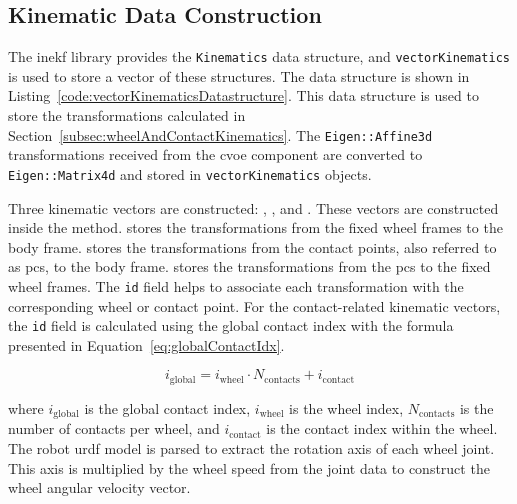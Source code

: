 \documentclass[report.tex]{subfiles}
\begin{document}
    \subsection{Kinematic Data Construction}
    
    The \gls{inekf} library provides the \texttt{Kinematics} data structure, and \texttt{vectorKinematics} is used to store a vector of these structures. The data structure is shown in Listing~\ref{code:vectorKinematicsDatastructure}. This data structure is used to store the transformations calculated in Section~\ref{subsec:wheelAndContactKinematics}. The \texttt{Eigen::Affine3d} transformations received from the \gls{cvoe} component are converted to \texttt{Eigen::Matrix4d} and stored in \texttt{vectorKinematics} objects. 
    
    Three kinematic vectors are constructed: , , and . These vectors are constructed inside the  method.  stores the transformations from the fixed wheel frames to the body frame.  stores the transformations from the contact points, also referred to as \glspl{pc}, to the body frame.  stores the transformations from the \glspl{pc} to the fixed wheel frames. The \texttt{id} field helps to associate each transformation with the corresponding wheel or contact point. For the contact-related kinematic vectors, the \texttt{id} field is calculated using the global contact index with the formula presented in Equation~\ref{eq:globalContactIdx}.
    
    \begin{equation}
        i_{\mathrm{global}} = i_{\mathrm{wheel}} \cdot N_{\mathrm{contacts}} + i_{\mathrm{contact}}
        \label{eq:globalContactIdx}
    \end{equation}
        
    where $i_{\mathrm{global}}$ is the global contact index, $i_{\mathrm{wheel}}$ is the wheel index, $N_{\mathrm{contacts}}$ is the number of contacts per wheel, and $i_{\mathrm{contact}}$ is the contact index within the wheel. The robot \gls{urdf} model is parsed to extract the rotation axis of each wheel joint. This axis is multiplied by the wheel speed from the joint data to construct the wheel angular velocity vector.
    
\end{document}
